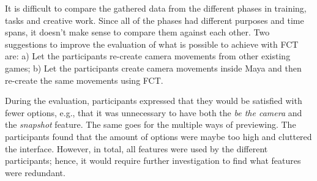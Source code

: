 It is difficult to compare the gathered data from the different phases in training, tasks and creative work. Since all of the phases had different purposes and time spans, it doesn't make sense to compare them against each other. Two suggestions to improve the evaluation of what is possible to achieve with FCT are: a) Let the participants re-create camera movements from other existing games; b) Let the participants create camera movements inside Maya and then re-create the same movements using FCT.

During the evaluation, participants expressed that they would be satisfied with fewer options, e.g., that it was unnecessary to have both the \textit{be the camera} and the \textit{snapshot} feature. The same goes for the multiple ways of previewing. The participants found that the amount of options were maybe too high and cluttered the interface. However, in total, all features were used by the different participants; hence, it would require further investigation to find what features were redundant.


